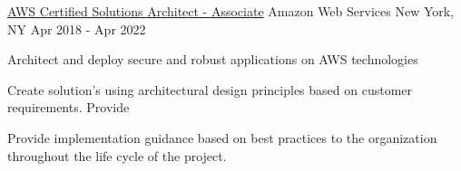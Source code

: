 \begin{cventries}
  \cventry
    {\color{hyperlink} \href{https://www.certmetrics.com/amazon/public/badge.aspx?i=1&t=c&d=2018-04-10&ci=AWS00382630}{AWS Certified Solutions Architect - Associate}}
    {Amazon Web Services}
    {New York, NY}
    {Apr 2018 - Apr 2022}
    {
      \begin{cvitems}
      \item{ Architect and deploy secure and robust applications on AWS technologies}
        \item {Create solution's using architectural design principles based on customer requirements.
Provide }
        \item {Provide implementation guidance based on best practices to the organization throughout the life cycle of the project.}
      \end{cvitems}
    }
\end{cventries}
